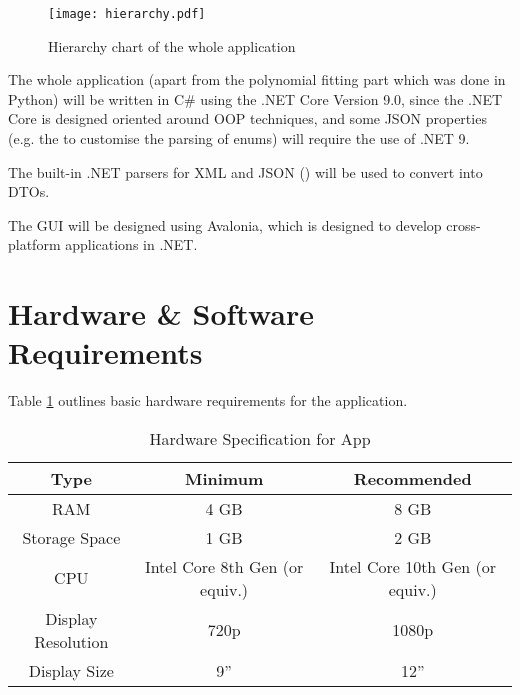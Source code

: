 \begin{figure}[!ht]
    \centering
    \texttt{[image: hierarchy.pdf]}
    \caption{Hierarchy chart of the whole application}
    \label{fig:hierarchy}
\end{figure}

The whole application (apart from the polynomial fitting part which was done in Python) will be written in C\# using the .NET Core Version 9.0, since the .NET Core is designed oriented around OOP techniques, and some JSON properties (e.g. the  to customise the parsing of enums) will require the use of .NET 9.

The built-in .NET parsers for XML and JSON () will be used to convert into DTOs.

The GUI will be designed using Avalonia, which is designed to develop cross-platform applications in .NET.

\section{Hardware \& Software Requirements}

Table \ref{tab:hardware-spec} outlines basic hardware requirements for the application.

\begin{table}[!ht]
    \centering

    \begin{tabular}{|c|c|c|}
        \hline
        Type               & Minimum                        & Recommended                     \\
        \hline
        RAM                & 4 GB                           & 8 GB                            \\
        Storage Space      & 1 GB                           & 2 GB                            \\
        CPU                & Intel Core 8th Gen (or equiv.) & Intel Core 10th Gen (or equiv.) \\
        Display Resolution & 720p                           & 1080p                           \\
        Display Size       & 9''                            & 12''                            \\
        \hline
    \end{tabular}
    \caption{Hardware Specification for App}
    \label{tab:hardware-spec}
\end{table}

